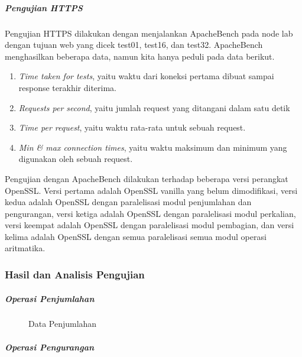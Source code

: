       \subparagraph{Pengujian HTTPS}
      Pengujian HTTPS dilakukan dengan menjalankan ApacheBench pada node lab dengan tujuan web yang dicek test01, test16, dan test32. ApacheBench menghasilkan beberapa data, namun kita hanya peduli pada data berikut.
      \begin{enumerate}[label=\roman*.]
        \item \textit{Time taken for tests}, yaitu waktu dari koneksi pertama dibuat sampai response terakhir diterima.
        \item \textit{Requests per second}, yaitu jumlah request yang ditangani dalam satu detik
        \item \textit{Time per request}, yaitu waktu rata-rata untuk sebuah request.
        \item \textit{Min \& max connection times}, yaitu waktu maksimum dan minimum yang digunakan oleh sebuah request.
      \end{enumerate}

      Pengujian dengan ApacheBench dilakukan terhadap beberapa versi perangkat OpenSSL. Versi pertama adalah OpenSSL vanilla yang belum dimodifikasi, versi kedua adalah OpenSSL dengan paralelisasi modul penjumlahan dan pengurangan, versi ketiga adalah OpenSSL dengan paralelisasi modul perkalian, versi keempat adalah OpenSSL dengan paralelisasi modul pembagian, dan versi kelima adalah OpenSSL dengan semua paralelisasi semua modul operasi aritmatika.

    \subsubsection{Hasil dan Analisis Pengujian}


      \subparagraph{Operasi Penjumlahan}
      \begin{figure}[h]
        \centering
        \caption{Data Penjumlahan}
        \label{fig:data_add}
      \end{figure}
      \subparagraph{Operasi Pengurangan}



